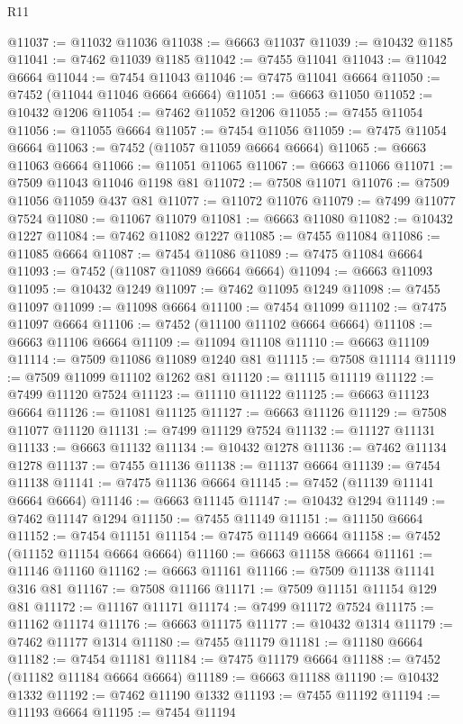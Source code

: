 \begin{lexlean}{R11}
\begin{coremodule}
@11037 := @11032 @11036
@11038 := @6663 @11037
@11039 := @10432 @1185
@11041 := @7462 @11039 @1185
@11042 := @7455 @11041
@11043 := @11042 @6664
@11044 := @7454 @11043
@11046 := @7475 @11041 @6664
@11050 := @7452 (@11044 @11046 @6664 @6664)
@11051 := @6663 @11050
@11052 := @10432 @1206
@11054 := @7462 @11052 @1206
@11055 := @7455 @11054
@11056 := @11055 @6664
@11057 := @7454 @11056
@11059 := @7475 @11054 @6664
@11063 := @7452 (@11057 @11059 @6664 @6664)
@11065 := @6663 @11063 @6664
@11066 := @11051 @11065
@11067 := @6663 @11066
@11071 := @7509 @11043 @11046 @1198 @81
@11072 := @7508 @11071
@11076 := @7509 @11056 @11059 @437 @81
@11077 := @11072 @11076
@11079 := @7499 @11077 @7524
@11080 := @11067 @11079
@11081 := @6663 @11080
@11082 := @10432 @1227
@11084 := @7462 @11082 @1227
@11085 := @7455 @11084
@11086 := @11085 @6664
@11087 := @7454 @11086
@11089 := @7475 @11084 @6664
@11093 := @7452 (@11087 @11089 @6664 @6664)
@11094 := @6663 @11093
@11095 := @10432 @1249
@11097 := @7462 @11095 @1249
@11098 := @7455 @11097
@11099 := @11098 @6664
@11100 := @7454 @11099
@11102 := @7475 @11097 @6664
@11106 := @7452 (@11100 @11102 @6664 @6664)
@11108 := @6663 @11106 @6664
@11109 := @11094 @11108
@11110 := @6663 @11109
@11114 := @7509 @11086 @11089 @1240 @81
@11115 := @7508 @11114
@11119 := @7509 @11099 @11102 @1262 @81
@11120 := @11115 @11119
@11122 := @7499 @11120 @7524
@11123 := @11110 @11122
@11125 := @6663 @11123 @6664
@11126 := @11081 @11125
@11127 := @6663 @11126
@11129 := @7508 @11077 @11120
@11131 := @7499 @11129 @7524
@11132 := @11127 @11131
@11133 := @6663 @11132
@11134 := @10432 @1278
@11136 := @7462 @11134 @1278
@11137 := @7455 @11136
@11138 := @11137 @6664
@11139 := @7454 @11138
@11141 := @7475 @11136 @6664
@11145 := @7452 (@11139 @11141 @6664 @6664)
@11146 := @6663 @11145
@11147 := @10432 @1294
@11149 := @7462 @11147 @1294
@11150 := @7455 @11149
@11151 := @11150 @6664
@11152 := @7454 @11151
@11154 := @7475 @11149 @6664
@11158 := @7452 (@11152 @11154 @6664 @6664)
@11160 := @6663 @11158 @6664
@11161 := @11146 @11160
@11162 := @6663 @11161
@11166 := @7509 @11138 @11141 @316 @81
@11167 := @7508 @11166
@11171 := @7509 @11151 @11154 @129 @81
@11172 := @11167 @11171
@11174 := @7499 @11172 @7524
@11175 := @11162 @11174
@11176 := @6663 @11175
@11177 := @10432 @1314
@11179 := @7462 @11177 @1314
@11180 := @7455 @11179
@11181 := @11180 @6664
@11182 := @7454 @11181
@11184 := @7475 @11179 @6664
@11188 := @7452 (@11182 @11184 @6664 @6664)
@11189 := @6663 @11188
@11190 := @10432 @1332
@11192 := @7462 @11190 @1332
@11193 := @7455 @11192
@11194 := @11193 @6664
@11195 := @7454 @11194

\end{coremodule}
\end{lexlean}
